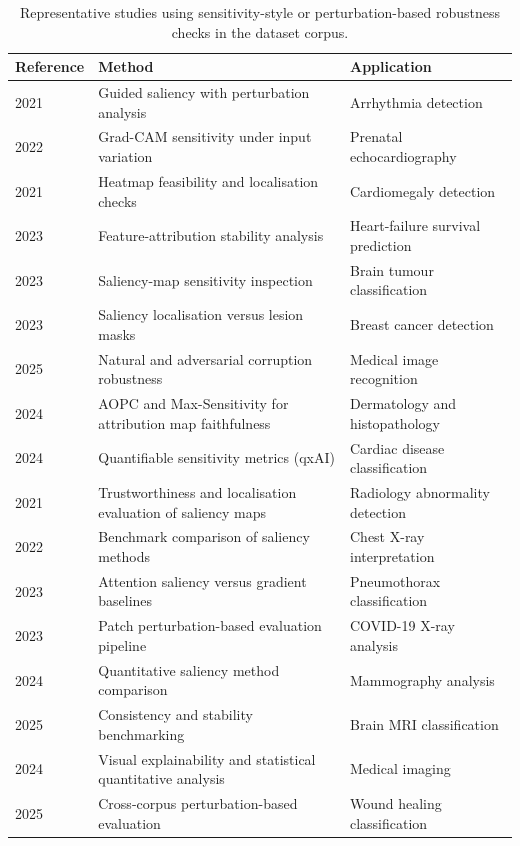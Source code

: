 \begin{table}[H]
\centering
\caption{Representative studies using sensitivity-style or perturbation-based robustness checks in the dataset corpus.}
\label{tab:sensitivity_methods}
\renewcommand{\arraystretch}{1.2}
\begin{tabularx}{\linewidth}{>{\raggedright\arraybackslash}p{2.5cm} >{\raggedright\arraybackslash}X >{\raggedright\arraybackslash}X}
\hline
\textbf{Reference} & \textbf{Method} & \textbf{Application} \\
\hline
\cite{Zhang2021} 2021       & Guided saliency with perturbation analysis      & Arrhythmia detection \\
\cite{Nurmaini2022} 2022     & Grad-CAM sensitivity under input variation      & Prenatal echocardiography \\
\cite{Lee2021Cardiomegaly} 2021 & Heatmap feasibility and localisation checks   & Cardiomegaly detection \\
\cite{MorenoSanchez2023} 2023 & Feature-attribution stability analysis         & Heart-failure survival prediction \\
\cite{Chmiel2023} 2023       & Saliency-map sensitivity inspection             & Brain tumour classification \\
\cite{Pertuz2023} 2023       & Saliency localisation versus lesion masks       & Breast cancer detection \\
\cite{Repetto2025EvaluatingTR} 2025 & Natural and adversarial corruption robustness & Medical image recognition \\
\cite{Patricio2024} 2024     & AOPC and Max-Sensitivity for attribution map faithfulness & Dermatology and histopathology \\
\cite{Pandey2024} 2024       & Quantifiable sensitivity metrics (qxAI)        & Cardiac disease classification \\
\cite{arun2021assessing} 2021 & Trustworthiness and localisation evaluation of saliency maps & Radiology abnormality detection \\
\cite{saporta2022benchmarking} 2022 & Benchmark comparison of saliency methods    & Chest X-ray interpretation \\
\cite{wollek2023attention} 2023 & Attention saliency versus gradient baselines  & Pneumothorax classification \\
\cite{sun2023improving} 2023  & Patch perturbation-based evaluation pipeline  & COVID-19 X-ray analysis \\
\cite{cerekci2024quantitative} 2024 & Quantitative saliency method comparison    & Mammography analysis \\
\cite{qin2025consistency} 2025 & Consistency and stability benchmarking       & Brain MRI classification \\
\cite{brima2024saliency} 2024 & Visual explainability and statistical quantitative analysis & Medical imaging \\
\cite{jacob2025indian} 2025   & Cross-corpus perturbation-based evaluation    & Wound healing classification \\
\hline
\end{tabularx}
\end{table}

